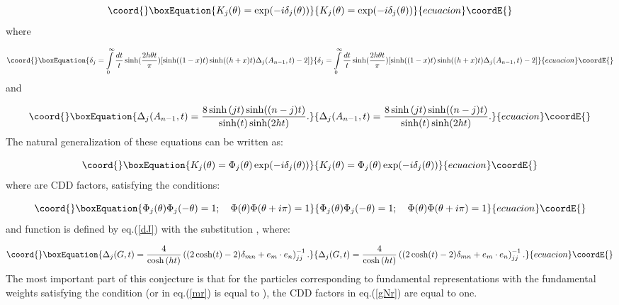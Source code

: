 \documentclass[a4paper,12pt]{article}
\begin{document}
\begin{equation}\coord{}\boxEquation{
K_j(\theta )=\exp (-i\delta _j(\theta ))  \label{kJ}
}{
K_j(\theta )=\exp (-i\delta _j(\theta ))  }{ecuacion}\coordE{}\end{equation}
where

\begin{equation}\coord{}\boxEquation{
\delta _j=\int\limits_0^\infty \frac{dt}t\sinh (\frac{2h\theta t}\pi )
[\sinh ((1-x)t)\sinh((h+x)t)
\Delta _j(A_{n-1},t)-2]  \label{dJ}
}{
\delta _j=\int\limits_0^\infty \frac{dt}t\sinh (\frac{2h\theta t}\pi )
[\sinh ((1-x)t)\sinh((h+x)t)
\Delta _j(A_{n-1},t)-2]  }{ecuacion}\coordE{}\end{equation}
and

\begin{equation}\coord{}\boxEquation{
\Delta _j(A_{n-1},t)=\frac{8\sinh \left( jt\right) \sinh ((n-j)t)}
{\sinh(t)\sinh (2ht)}.  \label{DJ}
}{
\Delta _j(A_{n-1},t)=\frac{8\sinh \left( jt\right) \sinh ((n-j)t)}
{\sinh(t)\sinh (2ht)}.  }{ecuacion}\coordE{}\end{equation}
The natural generalization of these equations can be written as:

\begin{equation}\coord{}\boxEquation{
K_j(\theta )=\Phi _j(\theta )\exp (-i\delta _j(\theta ))  \label{gNr}
}{
K_j(\theta )=\Phi _j(\theta )\exp (-i\delta _j(\theta ))  }{ecuacion}\coordE{}\end{equation}
where \coordHE{} are CDD factors, satisfying the conditions:

\begin{equation}\coord{}\boxEquation{
\Phi _j(\theta )\Phi _j(-\theta )=1;\quad \Phi (\theta )
\Phi (\theta +i\pi)=1  \label{cDd}
}{
\Phi _j(\theta )\Phi _j(-\theta )=1;\quad \Phi (\theta )
\Phi (\theta +i\pi)=1  }{ecuacion}\coordE{}\end{equation}
and function \coordHE{} 
is defined by eq.(\ref{dJ})
with the substitution 
\coordHE{}  \coordHE{},
where:

\begin{equation}\coord{}\boxEquation{
\Delta _j(G,t)=\frac 4{\cosh \left( ht\right) }\left( (2\cosh (t)-2)
\delta_{mn}+e_m\cdot e_n\right) _{jj}^{-1}.  \label{cOn}
}{
\Delta _j(G,t)=\frac 4{\cosh \left( ht\right) }\left( (2\cosh (t)-2)
\delta_{mn}+e_m\cdot e_n\right) _{jj}^{-1}.  }{ecuacion}\coordE{}\end{equation}
The most important part of this conjecture is that for the particles \coordHE{}
corresponding to fundamental representations \coordHE{} with the
fundamental weights satisfying the condition \coordHE{} 
(or \coordHE{} in eq.(\ref{mr}) is equal to \coordHE{}), 
the CDD factors \coordHE{}
in eq.(\ref{gNr}) are equal to one.
\end{document}
